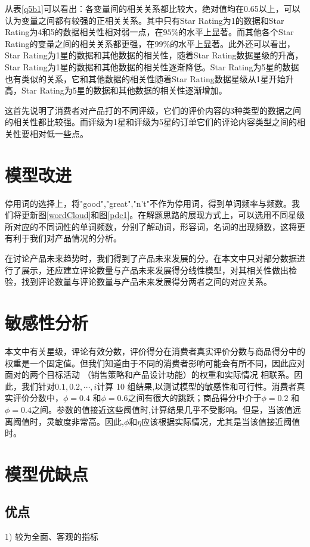 \documentclass[UTF8]{article}
\begin{document}
从表\ref{q5b1}可以看出：各变量间的相关关系都比较大，绝对值均在0.65以上，可以认为变量之间都有较强的正相关关系。其中只有Star Rating为1的数据和Star Rating为4和5的数据相关性相对弱一点，在\(95 \%\)的水平上显著。而其他各个Star Rating的变量之间的相关关系都更强，在\(99 \%\)的水平上显著。此外还可以看出，Star Rating为1星的数据和其他数据的相关性，随着Star Rating数据星级的升高，Star Rating为1星的数据和其他数据的相关性逐渐降低。Star Rating为5星的数据也有类似的关系，它和其他数据的相关性随着Star Rating数据星级从1星开始升高，Star Rating为5星的数据和其他数据的相关性逐渐增加。

这首先说明了消费者对产品打的不同评级，它们的评价内容的3种类型的数据之间的相关性都比较强。而评级为1星和评级为5星的订单它们的评论内容类型之间的相关性要相对低一些点。

\section*{模型改进}
停用词的选择上，将"good","great","n't"不作为停用词，得到单词频率与频数。我们将更新图\ref{wordCloud}和图\ref{pdc1}。在解题思路的展现方式上，可以选用不同星级所对应的不同词性的单词频数，分别了解动词，形容词，名词的出现频数，这将更有利于我们对产品情况的分析。

在讨论产品未来趋势时，我们得到了产品未来发展的分。在本文中只对部分数据进行了展示，还应建立评论数量与产品未来发展得分线性模型，对其相关性做出检验，找到评论数量与评论数量与产品未来发展得分两者之间的对应关系。

\section*{敏感性分析}
 本文中有关星级，评论有效分数，评价得分在消费者真实评价分数与商品得分中的权重是一个固定值。但我们知道由于不同的消费者影响可能会有所不同，因此应对面对的两个目标活动 （销售策略和产品设计功能）的权重和实际情况
相联系。因此，我们针对$0.1,0.2,\cdots,i$计算 10 组结果,以测试模型的敏感性和可行性。消费者真实评价分数中，$\phi=0.4$ 和$\phi=0.6$之间有很大的跳跃；商品得分中介于$\phi=0.2$ 和$\phi=0.4$之间。参数的值接近这些阈值时,计算结果几乎不受影响。但是，当该值远离阈值时，灵敏度非常高。因此,$\phi$和$\eta$应该根据实际情况，尤其是当该值接近阈值时。

\section*{模型优缺点}
\subsection*{优点}
1) 较为全面、客观的指标
\end{document}
